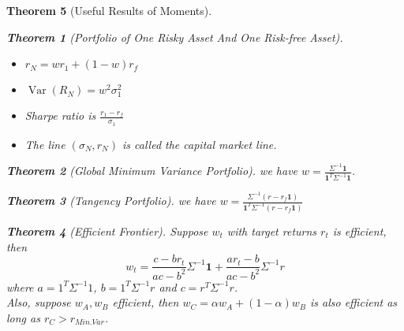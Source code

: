 \documentclass[11pt]{article}
\newtheorem{theorem}{Theorem}[section]
\theoremstyle{definition}
\DeclareMathOperator{\var}{Var}
\begin{document}
\begin{theorem}[Useful Results of Moments]
\begin{theorem}[Portfolio of One Risky Asset And One Risk-free Asset]
\begin{itemize}
  \item $r_N=wr_1 + (1-w)r_f$
  \item $\var(R_N)=w^2\sigma_1^2$
  \item Sharpe ratio is $\frac{r_1-r_f}{\sigma_1}$
  \item The line $(\sigma_N, r_N)$ is called the capital market line.
\end{itemize}
\end{theorem}
\begin{theorem}[Global Minimum Variance Portfolio]
\normalfont we have $w=\frac{\Sigma^{-1}\mathbf{1}}{\mathbf{1}^T\Sigma^{-1}\mathbf{1}}$.
\end{theorem}
\begin{theorem}[Tangency Portfolio]
\normalfont we have $w=\frac{\Sigma^{-1}(r-r_f\mathbf{1})}{\mathbf{1}^T\Sigma^{-1}(r-r_f\mathbf{1})}$
\end{theorem}
\begin{theorem}[Efficient Frontier]
\normalfont Suppose $w_t$ with target returns $r_t$ is efficient, then
\[
w_t=\frac{c-br_t}{ac-b^2}\Sigma^{-1}\mathbf{1}+\frac{ar_t-b}{ac-b^2}\Sigma^{-1}r
\]
where $a=1^T\Sigma^{-1}1$, $b=1^T\Sigma^{-1}r$ and $c=r^T\Sigma^{-1}r$.\\
Also, suppose $w_A, w_B$ efficient, then $w_C=\alpha w_A + (1-\alpha)w_B$ is also efficient as long as $r_C>r_{Min.Var}$.
\end{theorem}

\end{theorem}
\end{document}
